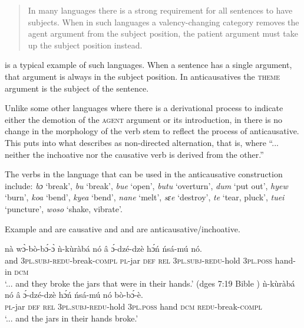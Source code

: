 \documentclass[output=paper]{langsci/langscibook}
\begin{document}
\begin{quote}
In many languages there is a strong requirement for all sentences to have subjects. When in such languages a valency-changing category removes the agent argument from the subject position, the patient argument must take up the subject position instead.
\end{quote}

 is a typical example of such languages. When a sentence has a single argument, that argument is always in the subject position. In  anticausatives the \textsc{theme} argument is the subject of the sentence. 

Unlike some other languages where there is a derivational process to indicate either the demotion of the \textsc{agent} argument or its introduction, in  there is no change in the morphology of the verb stem to reflect the process of anticausative. This puts  into what \citet[91]{haspelmath1993} describes as non-directed alternation, that is, where ``... neither the inchoative nor the causative verb is derived from the other.''

The verbs in the language that can be used in the anticausative construction include: \textit{bɔ} `break', \textit{bu} `break', \textit{bue} `open', \textit{butu} `overturn', \textit{dum} `put out', \textit{hyew} `burn', \textit{koa} `bend', \textit{kyea} `bend', \textit{nane} `melt', \textit{sɛe} `destroy', \textit{te} `tear, pluck', \textit{tuei} `puncture', \textit{woso} `shake, vibrate'. 

Example  and  are causative and  and  are anticausative/inchoative.

\ea\label{ex:33.osam}
\ea\label{ex:33a.osam}
\gll nà  wɔ̀-bò-bɔ́-ɔ̀  ǹ-kùràbá   nó â ɔ́-dzé-dzè    hɔ́ń    ńsá-mú    nó.\\
       and  \textsc{3pl.subj}-\textsc{redu}-break\textsc{-compl}  \textsc{pl}-jar    \textsc{def}  \textsc{rel}    \textsc{3pl.subj}-\textsc{redu}-hold  \textsc{3pl.poss}  hand-in  \textsc{dcm}\\
\glt `...  and they broke the jars that were in their hands.' (dges 7:19  Bible \citep{bible1974})
\ex\label{ex:33b.osam}
\gll   ǹ-kùràbá   nó  â ɔ́-dzé-dzè    hɔ́ń ńsá-mú    nó    bò-bɔ́-è. \\
       \textsc{pl}-jar    \textsc{def}  \textsc{rel}  \textsc{3pl.subj}-\textsc{redu}-hold  \textsc{3pl.poss}  hand    \textsc{dcm}    \textsc{redu}-break-\textsc{compl}\\
\glt `...  and the jars in their hands broke.'
\z 
\z 
\end{document}
